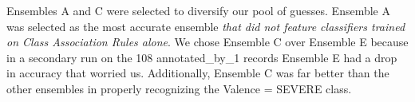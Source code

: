 \textsf{Ensembles A} and \textsf{C} were selected to diversify our 
pool of guesses. \textsf{Ensemble A} was
selected as the most accurate ensemble \textit{that did
not feature classifiers trained on Class Association Rules alone}.
We chose \textsf{Ensemble C} over \textsf{Ensemble E} because
in a secondary run on the 108 \textsf{annotated\_by\_1} records
\textsf{Ensemble E} had a drop in accuracy that worried us.
Additionally, \textsf{Ensemble C} was far better than the other
ensembles in properly recognizing the \textsf{Valence = SEVERE} class.










